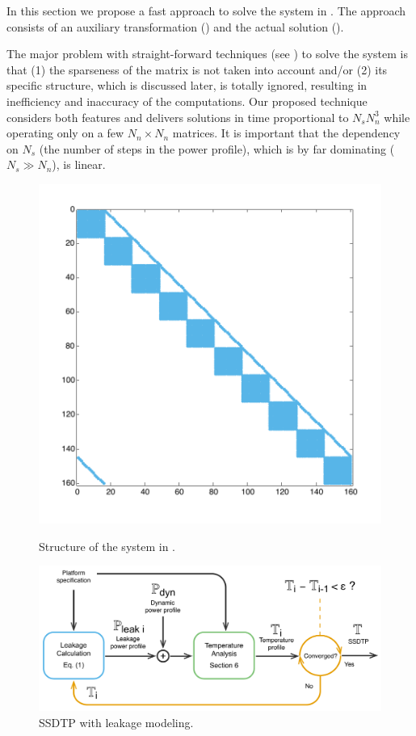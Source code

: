 In this section we propose a fast approach to solve the system in . The approach consists of an auxiliary transformation () and the actual solution ().

The major problem with straight-forward techniques (see ) to solve the system is that (1) the sparseness of the matrix is not taken into account and/or (2) its specific structure, which is discussed later, is totally ignored, resulting in inefficiency and inaccuracy of the computations. Our proposed technique considers both features and delivers solutions in time proportional to $N_s N_n^3$ while operating only on a few $N_n \times N_n$ matrices. It is important that the dependency on $N_s$ (the number of steps in the power profile), which is by far dominating ($N_s \gg N_n$), is linear.
\begin{figure}
  \centering
  \begin{minipage}{0.45\linewidth}
    \centering
    \includegraphics[clip=true, trim=20 30 20 20, width=0.4\linewidth]{assets/sparseness-of-system.pdf}
    \caption{Structure of the system in .}
    \label{fig:sparseness-of-system}
  \end{minipage}
  \hspace{5pt}
  \begin{minipage}{0.45\linewidth}
    \centering
    \includegraphics[width=0.9\linewidth]{assets/leakage.pdf}
    \caption{SSDTP with leakage modeling.}
    \label{fig:leakage}
  \end{minipage}
\end{figure}

